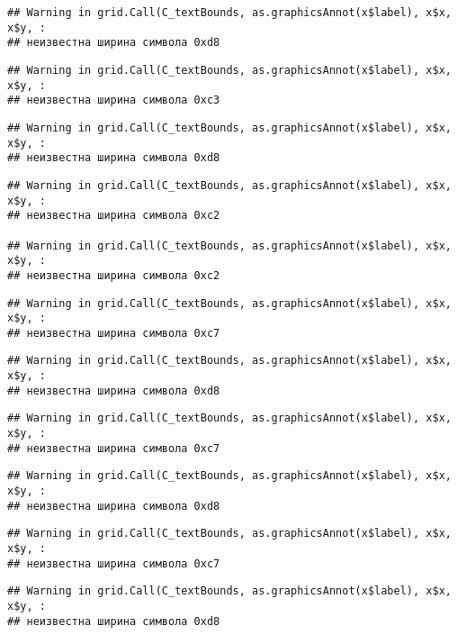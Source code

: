 \documentclass[
]{article}
\begin{document}
\begin{verbatim}
## Warning in grid.Call(C_textBounds, as.graphicsAnnot(x$label), x$x, x$y, :
## неизвестна ширина символа 0xd8
\end{verbatim}

\begin{verbatim}
## Warning in grid.Call(C_textBounds, as.graphicsAnnot(x$label), x$x, x$y, :
## неизвестна ширина символа 0xc3
\end{verbatim}

\begin{verbatim}
## Warning in grid.Call(C_textBounds, as.graphicsAnnot(x$label), x$x, x$y, :
## неизвестна ширина символа 0xd8
\end{verbatim}

\begin{verbatim}
## Warning in grid.Call(C_textBounds, as.graphicsAnnot(x$label), x$x, x$y, :
## неизвестна ширина символа 0xc2

## Warning in grid.Call(C_textBounds, as.graphicsAnnot(x$label), x$x, x$y, :
## неизвестна ширина символа 0xc2
\end{verbatim}

\begin{verbatim}
## Warning in grid.Call(C_textBounds, as.graphicsAnnot(x$label), x$x, x$y, :
## неизвестна ширина символа 0xc7
\end{verbatim}

\begin{verbatim}
## Warning in grid.Call(C_textBounds, as.graphicsAnnot(x$label), x$x, x$y, :
## неизвестна ширина символа 0xd8
\end{verbatim}

\begin{verbatim}
## Warning in grid.Call(C_textBounds, as.graphicsAnnot(x$label), x$x, x$y, :
## неизвестна ширина символа 0xc7
\end{verbatim}

\begin{verbatim}
## Warning in grid.Call(C_textBounds, as.graphicsAnnot(x$label), x$x, x$y, :
## неизвестна ширина символа 0xd8
\end{verbatim}

\begin{verbatim}
## Warning in grid.Call(C_textBounds, as.graphicsAnnot(x$label), x$x, x$y, :
## неизвестна ширина символа 0xc7
\end{verbatim}

\begin{verbatim}
## Warning in grid.Call(C_textBounds, as.graphicsAnnot(x$label), x$x, x$y, :
## неизвестна ширина символа 0xd8
\end{verbatim}
\end{document}
